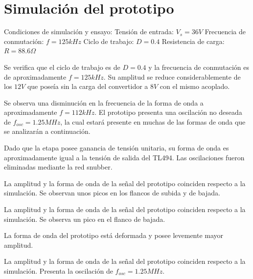 \section{Simulación del prototipo}

Condiciones de simulación y ensayo: 
Tensión de entrada: $V_s=36V$
Frecuencia de conmutación: $f=125kHz$
Ciclo de trabajo: $D=0.4$  
Resistencia de carga: $R=88.6\Omega$


Se verifica que el ciclo de trabajo es de $D=0.4$ y la frecuencia de conmutación es de aproximadamente $f=125kHz$. 
Su amplitud se reduce considerablemente de los $12V$ que poseía sin la carga del convertidor a $8V$ con el mismo acoplado. 


Se observa una disminución en la frecuencia de la forma de onda a aproximadamente $f=112kHz$. 
El prototipo presenta una oscilación no deseada de $f_{osc}=1.25MHz$, 
la cual estará presente en muchas de las formas de onda que se analizarán a continuación. 


Dado que la etapa posee ganancia de tensión unitaria, su forma de onda es aproximadamente igual a la tensión de salida del TL494. 
Las oscilaciones fueron eliminadas mediante la red snubber. 


La amplitud y la forma de onda de la señal del prototipo coinciden respecto a la simulación. 
Se observan unos picos en los flancos de subida y de bajada. 


La amplitud y la forma de onda de la señal del prototipo coinciden respecto a la simulación. 
Se observa un pico en el flanco de bajada. 


La forma de onda del prototipo está deformada y posee levemente mayor amplitud. 


La amplitud y la forma de onda de la señal del prototipo coinciden respecto a la simulación. 
Presenta la oscilación de $f_{osc}=1.25MHz$. 

